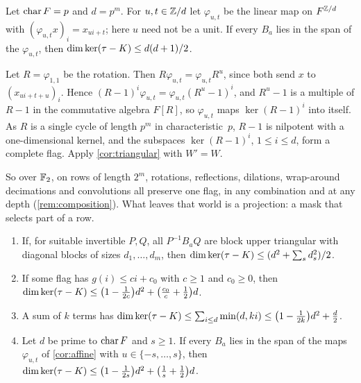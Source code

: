 \begin{corollary}\label{cor:affine}
\notformalized
Let $\operatorname{char} F=p$ and $d=p^m$. For $u,t\in\mathbb{Z}/d$ let $\varphi_{u,t}$ be the linear map on $F^{\mathbb{Z}/d}$ with
$(\varphi_{u,t}x)_i=x_{ui+t}$; here $u$ need not be a unit. If every $B_a$ lies in the span of the $\varphi_{u,t}$, then
$\dim\ker(\tau-K)\le d(d+1)/2$.
\end{corollary}

\begin{informalproof}
Let $R=\varphi_{1,1}$ be the rotation. Then $R\varphi_{u,t}=\varphi_{u,t}R^u$, since both send $x$ to
$(x_{ui+t+u})_i$. Hence $(R-1)^i\varphi_{u,t}=\varphi_{u,t}(R^u-1)^i$, and $R^u-1$ is a multiple of $R-1$ in the
commutative algebra $F[R]$, so $\varphi_{u,t}$ maps $\ker(R-1)^i$ into itself. As $R$ is a single cycle of length
$p^m$ in characteristic~$p$, $R-1$ is nilpotent with a one-dimensional kernel, and the subspaces $\ker(R-1)^i$,
$1\le i\le d$, form a complete flag. Apply \cref{cor:triangular} with $W'=W$.
\end{informalproof}

So over $\mathbb{F}_2$, on rows of length $2^m$, rotations, reflections, dilations, wrap-around decimations and convolutions
all preserve one flag, in any combination and at any depth (\cref{rem:composition}). What leaves that world is a
projection: a mask that selects part of a row.

\begin{corollary}\label{cor:expansion}
\notformalized
\begin{enumerate}[label=(\alph*),leftmargin=2em]
\item If, for suitable invertible $P,Q$, all $P^{-1}B_aQ$ are block upper triangular with diagonal blocks of sizes
$d_1,\dots,d_m$, then $\dim\ker(\tau-K)\le(d^2+\sum_sd_s^2)/2$.
\item If some flag has $g(i)\le ci+c_0$ with $c\ge1$ and $c_0\ge0$, then
$\dim\ker(\tau-K)\le\bigl(1-\frac1{2c}\bigr)d^2+\bigl(\frac{c_0}c+\frac12\bigr)d$.
\item A sum of $k$ terms has $\dim\ker(\tau-K)\le\sum_{i\le d}\min(d,ki)\le\bigl(1-\frac1{2k}\bigr)d^2+\frac d2$.
\item Let $d$ be prime to $\operatorname{char} F$ and $s\ge1$. If every $B_a$ lies in the span of the maps $\varphi_{u,t}$ of
\cref{cor:affine} with $u\in\{-s,\dots,s\}$, then $\dim\ker(\tau-K)\le\bigl(1-\frac1{2s}\bigr)d^2+\bigl(\frac1s+\frac12\bigr)d$.
\end{enumerate}
\end{corollary}

